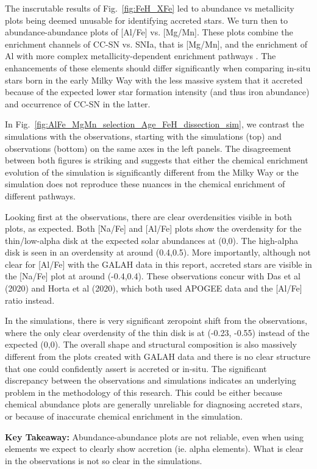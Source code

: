 \documentclass[fleqn,usenatbib]{mnras}
\begin{document}
The inscrutable results of Fig.~\ref{fig:FeH_XFe} led to abundance vs metallicity plots being deemed unusable for identifying accreted stars. We turn then to abundance-abundance plots of [Al/Fe] vs. [Mg/Mn]. These plots combine the enrichment channels of CC-SN vs. SNIa, that is [Mg/Mn], and the enrichment of Al with more complex metallicity-dependent enrichment pathways \citep{Hawkins2015, Das2020, Kobayashi2020}. The enhancements of these elements should differ significantly when comparing in-situ stars born in the early Milky Way with the less massive system that it accreted because of the expected lower star formation intensity (and thus iron abundance) and occurrence of CC-SN in the latter. 

In Fig.~\ref{fig:AlFe_MgMn_selection_Age_FeH_dissection_sim}, we contrast the simulations with the observations, starting with the simulations (top) and observations (bottom) on the same axes in the left panels. The disagreement between both figures is striking and suggests that either the chemical enrichment evolution of the simulation is significantly different from the Milky Way or the simulation does not reproduce these nuances in the chemical enrichment of different pathways.


 Looking first at the observations, there are clear overdensities visible in both plots, as expected. Both [Na/Fe] and [Al/Fe] plots show the overdensity for the thin/low-alpha disk at the expected solar abundances at (0,0). The high-alpha disk is seen in an overdensity at around (0.4,0.5). More importantly, although not clear for [Al/Fe] with the GALAH data in this report, accreted stars are visible in the [Na/Fe] plot at around (-0.4,0.4). These observations concur with Das et al (2020) and Horta et al (2020), which both used APOGEE data and the [Al/Fe] ratio instead. \par 
In the simulations, there is very significant zeropoint shift from the observations, where the only clear overdensity of the thin disk is at (-0.23, -0.55) instead of the expected (0,0). The overall shape and structural composition is also massively different from the plots created with GALAH data and there is no clear structure that one could confidently assert is accreted or in-situ. The significant discrepancy between the observations and simulations indicates an underlying problem in the methodology of this research. This could be either because chemical abundance plots are generally unreliable for diagnosing accreted stars, or because of inaccurate chemical enrichment in the simulation. \par 
\textbf{Key Takeaway:} Abundance-abundance plots are not reliable, even when using elements we expect to clearly show accretion (ie. alpha elements). What is clear in the observations is not so clear in the simulations.
\end{document}
